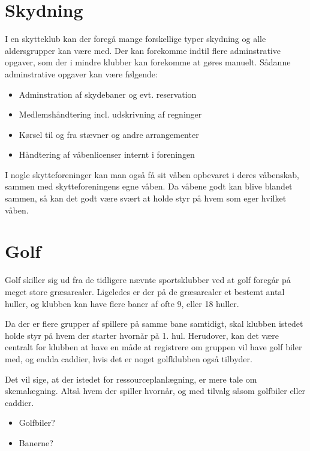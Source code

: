\section{Skydning}
I en skytteklub kan der foregå mange forskellige typer skydning og alle aldersgrupper kan være med. Der kan forekomme indtil flere adminstrative opgaver, som der i mindre klubber kan forekomme at gøres manuelt. Sådanne adminstrative opgaver kan være følgende:
\begin{itemize}
\item Adminstration af skydebaner og evt. reservation
\item Medlemshåndtering incl. udskrivning af regninger
\item Kørsel til og fra stævner og andre arrangementer
\item Håndtering af våbenlicenser internt i foreningen
\end{itemize}
I nogle skytteforeninger kan man også få sit våben opbevaret i deres våbenskab, sammen med skytteforeningens egne våben. Da våbene godt kan blive blandet sammen, så kan det godt være svært at holde styr på hvem som eger hvilket våben.

\section{Golf}
Golf skiller sig ud fra de tidligere nævnte sportsklubber ved at golf foregår på meget store græsarealer. Ligeledes er der på de græsarealer et bestemt antal huller, og klubben kan have flere baner af ofte 9, eller 18 huller. 

Da der er flere grupper af spillere på samme bane samtidigt, skal klubben istedet holde styr på hvem der starter hvornår på 1. hul. Herudover, kan det være centralt for klubben at have en måde at registrere om gruppen vil have golf biler med, og endda caddier, hvis det er noget golfklubben også tilbyder.

Det vil sige, at der istedet for ressourceplanlægning, er mere tale om skemalægning. Altså hvem der spiller hvornår, og med tilvalg såsom golfbiler eller caddier.
\begin{itemize}
\item Golfbiler?
\item Banerne?
\end{itemize}

